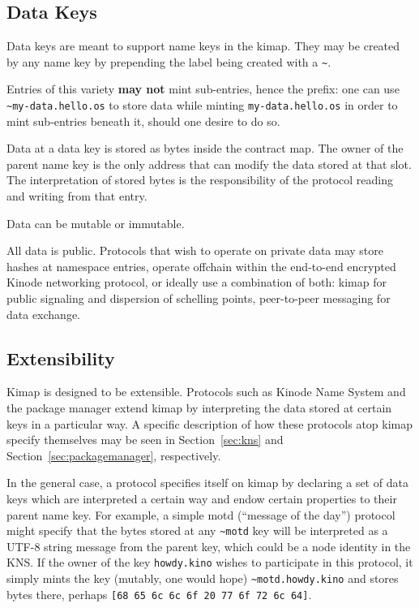 \documentclass[runningheads]{llncs}
\begin{document}
\subsection{Data Keys}

Data keys are meant to support name keys in the kimap. They may be created by any name key by prepending the label being created with a \verb|~|.

Entries of this variety \textbf{may not} mint sub-entries, hence the prefix: one can use \verb|~my-data.hello.os| to store data while minting \verb|my-data.hello.os| in order to mint sub-entries beneath it, should one desire to do so.

Data at a data key is stored as bytes inside the contract map.
The owner of the parent name key is the only address that can modify the data stored at that slot.
The interpretation of stored bytes is the responsibility of the protocol reading and writing from that entry.

Data can be mutable or immutable.

All data is public. Protocols that wish to operate on private data may store hashes at namespace entries, operate offchain within the end-to-end encrypted Kinode networking protocol, or ideally use a combination of both: kimap for public signaling and dispersion of schelling points, peer-to-peer messaging for data exchange.

\subsection{Extensibility}
\label{sec:extensibility}

Kimap is designed to be extensible.
Protocols such as Kinode Name System and the package manager extend kimap by interpreting the data stored at certain keys in a particular way.
A specific description of how these protocols atop kimap specify themselves may be seen in Section~\ref{sec:kns} and Section~\ref{sec:packagemanager}, respectively.

In the general case, a protocol specifies itself on kimap by declaring a set of data keys which are interpreted a certain way and endow certain properties to their parent name key.
For example, a simple motd (``message of the day'') protocol might specify that the bytes stored at any \verb|~motd| key will be interpreted as a UTF-8 string message from the parent key, which could be a node identity in the KNS.
If the owner of the key \verb|howdy.kino| wishes to participate in this protocol, it simply mints the key (mutably, one would hope) \verb|~motd.howdy.kino| and stores bytes there, perhaps \verb|[68 65 6c 6c 6f 20 77 6f 72 6c 64]|.
\end{document}
